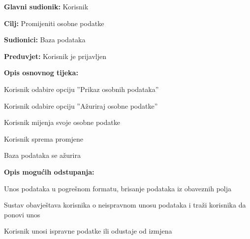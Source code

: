 					\noindent {}
					\begin{packed_item}
						
						\item \textbf{Glavni sudionik: }Korisnik
						\item  \textbf{Cilj:} Promijeniti osobne podatke
						\item  \textbf{Sudionici:} Baza podataka
						\item  \textbf{Preduvjet:} Korisnik je prijavljen
						\item  \textbf{Opis osnovnog tijeka:}
						
						\item[] \begin{packed_enum}
							
							\item Korisnik odabire opciju ”Prikaz osobnih podataka”
							\item Korisnik odabire opciju ”Ažuriraj osobne podatke”
							\item Korisnik mijenja svoje osobne podatke
							\item Korisnik sprema promjene
							\item Baza podataka se ažurira
						\end{packed_enum}
						
						\item  \textbf{Opis mogućih odstupanja:}
						
						\item[] \begin{packed_item}
							
							\item[3.a] Unos podataka u pogrešnom formatu, brisanje podataka iz obaveznih polja
							\item[] \begin{packed_enum}
								
								\item Sustav obavještava korisnika o neispravnom unosu podataka i traži korisnika da ponovi unos
								\item Korisnik unosi ispravne podatke ili odustaje od izmjena
								
							\end{packed_enum}
							
						\end{packed_item}
					\end{packed_item}
					
